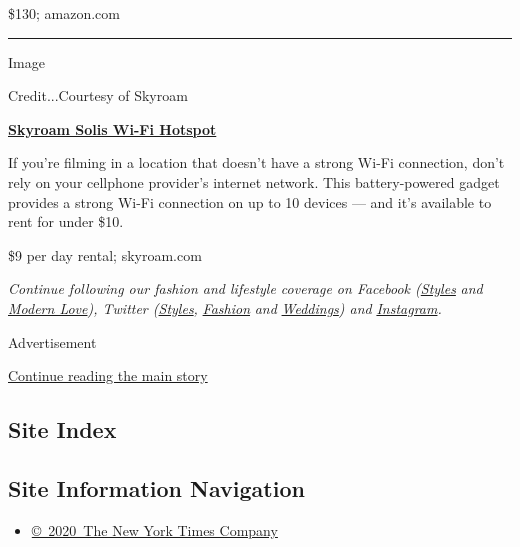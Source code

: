 \$130; amazon.com

\begin{center}\rule{0.5\linewidth}{\linethickness}\end{center}

Image

Credit...Courtesy of Skyroam

\textbf{\href{https://www.skyroam.com/skyroam-hotspot-rental}{Skyroam
Solis Wi-Fi Hotspot}}

If you're filming in a location that doesn't have a strong Wi-Fi
connection, don't rely on your cellphone provider's internet network.
This battery-powered gadget provides a strong Wi-Fi connection on up to
10 devices --- and it's available to rent for under \$10.

\$9 per day rental; skyroam.com

\emph{Continue following our fashion and lifestyle coverage on Facebook
(}\href{https://www.facebook.com/nytimesstyles}{\emph{Styles}}
\emph{and} \href{https://www.facebook.com/modernlove}{\emph{Modern
Love}}\emph{), Twitter
(}\href{https://twitter.com/nytstyles}{\emph{Styles}}\emph{,}
\href{https://twitter.com/nytfashion}{\emph{Fashion}} \emph{and}
\href{https://twitter.com/nytimesvows}{\emph{Weddings}}\emph{) and}
\href{https://instagram.com/nytimesfashion}{\emph{Instagram}}\emph{.}

Advertisement

\protect\hyperlink{after-bottom}{Continue reading the main story}

\hypertarget{site-index}{%
\subsection{Site Index}\label{site-index}}

\hypertarget{site-information-navigation}{%
\subsection{Site Information
Navigation}\label{site-information-navigation}}

\begin{itemize}
\tightlist
\item
  \href{https://help.nytimes.com/hc/en-us/articles/115014792127-Copyright-notice}{©~2020~The
  New York Times Company}
\end{itemize}

